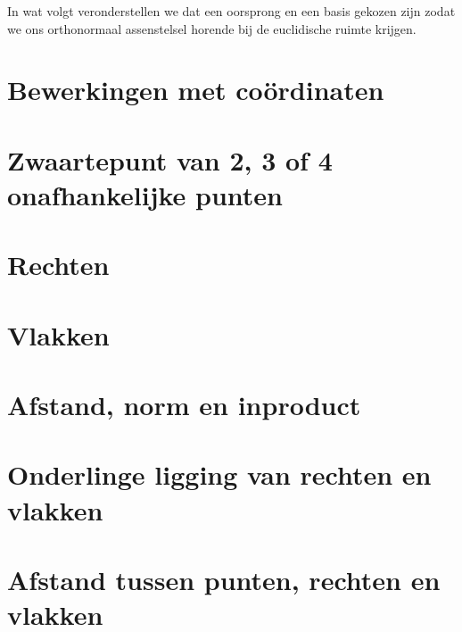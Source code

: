 \documentclass[12pt,twoside]{article}
\begin{document}
\begin{theorie}
In wat volgt veronderstellen we dat een oorsprong en een basis gekozen zijn zodat we ons orthonormaal assenstelsel horende bij de euclidische ruimte krijgen.

\pagebreak
\section{Bewerkingen met coördinaten}

\pagebreak
\section{Zwaartepunt van 2, 3 of 4 onafhankelijke punten}

\pagebreak
\section{Rechten}

\pagebreak
\section{Vlakken}

\pagebreak
\section{Afstand, norm en inproduct}

\pagebreak
\section{Onderlinge ligging van rechten en vlakken}

\pagebreak
\section{Afstand tussen punten, rechten en vlakken}

\end{theorie}
\end{document}
